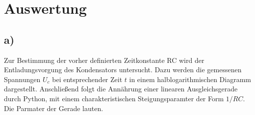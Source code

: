\section{Auswertung}
\subsection{a)}  %
Zur Bestimmung der vorher definierten Zeitkonstante RC wird der Entladungsvorgung des Kondensators untersucht.
Dazu werden die gemessenen Spannungen $U_c$ bei entsprechender Zeit $t$ in einem halblogarithmischen Diagramm dargestellt.
Anschließend folgt die Annährung einer linearen Ausgleichsgerade durch Python, mit einem charakteristischen Steigungsparamter
der Form $1/RC$. Die Parmater der Gerade lauten.
